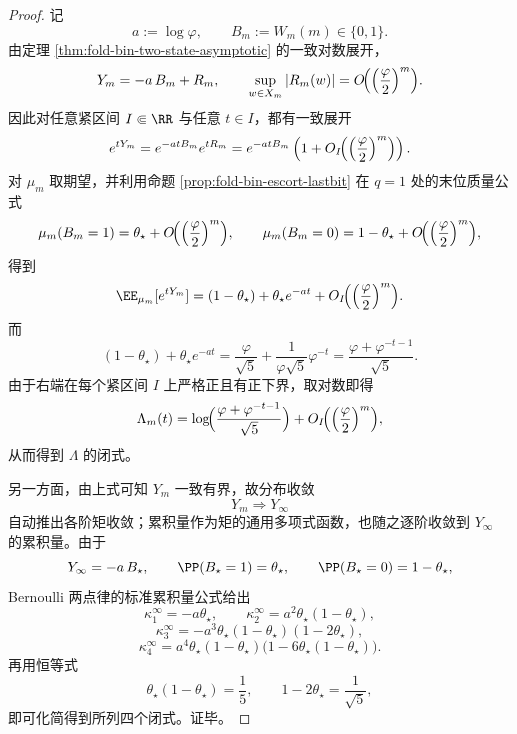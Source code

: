 \begin{proof}
记
\[
a:=\log\varphi,
\qquad
B_m:=W_m(m)\in\{0,1\}.
\]
由定理 \ref{thm:fold-bin-two-state-asymptotic} 的一致对数展开，
\[
Y_m=-a\,B_m+R_m,
\qquad
\sup_{w\in X_m}|R_m(w)|
=
O\!\Bigl(\Bigl(\frac{\varphi}{2}\Bigr)^m\Bigr).
\]
因此对任意紧区间 \(I\Subset\RR\) 与任意 \(t\in I\)，都有一致展开
\[
e^{tY_m}
=
e^{-atB_m}e^{tR_m}
=
e^{-atB_m}
\left(
1+O_I\!\Bigl(\Bigl(\frac{\varphi}{2}\Bigr)^m\Bigr)
\right).
\]
对 \(\mu_m\) 取期望，并利用命题 \ref{prop:fold-bin-escort-lastbit} 在 \(q=1\) 处的末位质量公式
\[
\mu_m(B_m=1)=\theta_\star+O\!\Bigl(\Bigl(\frac{\varphi}{2}\Bigr)^m\Bigr),
\qquad
\mu_m(B_m=0)=1-\theta_\star+O\!\Bigl(\Bigl(\frac{\varphi}{2}\Bigr)^m\Bigr),
\]
得到
\[
\EE_{\mu_m}[e^{tY_m}]
=
(1-\theta_\star)+\theta_\star e^{-at}
+O_I\!\Bigl(\Bigl(\frac{\varphi}{2}\Bigr)^m\Bigr).
\]
而
\[
(1-\theta_\star)+\theta_\star e^{-at}
=
\frac{\varphi}{\sqrt5}+\frac{1}{\varphi\sqrt5}\varphi^{-t}
=
\frac{\varphi+\varphi^{-t-1}}{\sqrt5}.
\]
由于右端在每个紧区间 \(I\) 上严格正且有正下界，取对数即得
\[
\Lambda_m(t)
=
\log\!\Bigl(\frac{\varphi+\varphi^{-t-1}}{\sqrt5}\Bigr)
+O_I\!\Bigl(\Bigl(\frac{\varphi}{2}\Bigr)^m\Bigr),
\]
从而得到 \(\Lambda\) 的闭式。

另一方面，由上式可知 \(Y_m\) 一致有界，故分布收敛
\[
Y_m\Rightarrow Y_\infty
\]
自动推出各阶矩收敛；累积量作为矩的通用多项式函数，也随之逐阶收敛到 \(Y_\infty\) 的累积量。由于
\[
Y_\infty=-a\,B_\star,
\qquad
\PP(B_\star=1)=\theta_\star,
\qquad
\PP(B_\star=0)=1-\theta_\star,
\]
Bernoulli 两点律的标准累积量公式给出
\[
\kappa_1^\infty=-a\theta_\star,\qquad
\kappa_2^\infty=a^2\theta_\star(1-\theta_\star),
\]
\[
\kappa_3^\infty=-a^3\theta_\star(1-\theta_\star)(1-2\theta_\star),
\]
\[
\kappa_4^\infty=a^4\theta_\star(1-\theta_\star)\bigl(1-6\theta_\star(1-\theta_\star)\bigr).
\]
再用恒等式
\[
\theta_\star(1-\theta_\star)=\frac15,
\qquad
1-2\theta_\star=\frac{1}{\sqrt5},
\]
即可化简得到所列四个闭式。证毕。
\end{proof}

